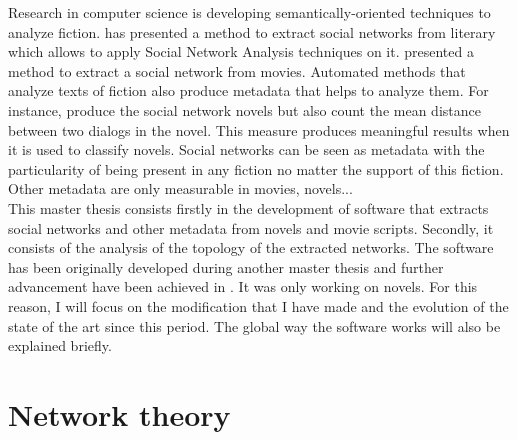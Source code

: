 \documentclass[a4paper, 12pt]{report}
\begin{document}
Research in computer science is developing semantically-oriented techniques to analyze fiction. \cite{character_country} has presented a method to extract social networks from literary which allows to apply Social Network Analysis techniques on it. \cite{movie} presented a method to extract a social network from movies. Automated methods that analyze texts of fiction also produce metadata that helps to analyze them. For instance, \cite{original} produce the social network novels but also count the mean distance between two dialogs in the novel. This measure produces meaningful results when it is used to classify novels. Social networks can be seen as metadata with the particularity of being present in any fiction no matter the support of this fiction. Other metadata are only measurable in movies, novels... \\

This master thesis consists firstly in the development of software that extracts social networks and other metadata from novels and movie scripts. Secondly, it consists of the analysis of the topology of the extracted networks. The software has been originally developed during another master thesis \citep{original_thesis} and further advancement have been achieved in \cite{original}. It was only working on novels. For this reason, I will focus on the modification that I have made and the evolution of the state of the art since this period. The global way the software works will also be explained briefly. \\


\chapter{Network theory}
\begin{table}
\center
{}
\caption{Example of social networks \citep{SNA_Overview}}\label{SNA_Exemple}
\end{table}
\end{document}
